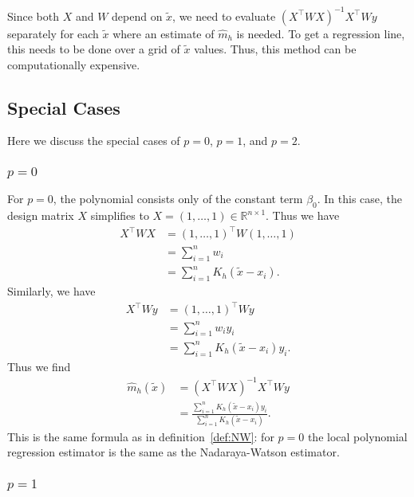 \documentclass[
  a4paper,
]{article}
\theoremstyle{definition}
\theoremstyle{definition}
\theoremstyle{definition}
\theoremstyle{definition}
\theoremstyle{remark}
\begin{document}
Since both \(X\) and \(W\) depend on \(\tilde x\), we need to evaluate
\((X^\top W X)^{-1} X^\top W y\) separately for each \(\tilde x\) where
an estimate of \(\hat m_h\) is needed. To get a regression line, this needs
to be done over a grid of \(\tilde x\) values. Thus, this method can
be computationally expensive.

\subsection{Special Cases}\label{special-cases}

Here we discuss the special cases of \(p=0\), \(p=1\), and \(p=2\).

\subsubsection*{\texorpdfstring{\(p = 0\)}{p = 0}}\label{p-0}

For \(p=0\), the polynomial consists only of the constant term \(\beta_0\).
In this case, the design matrix \(X\) simplifies to \(X = (1, \ldots, 1) \in
\mathbb{R}^{n\times 1}\). Thus we have
\begin{align*}
  X^\top W X
  &= (1, \ldots, 1)^\top W (1, \ldots, 1) \\
  &= \sum_{i=1}^n w_i \\
  &= \sum_{i=1}^n K_h(\tilde x - x_i).
\end{align*}
Similarly, we have
\begin{align*}
  X^\top W y
  &= (1, \ldots, 1)^\top W y \\
  &= \sum_{i=1}^n w_i y_i \\
  &= \sum_{i=1}^n K_h(\tilde x - x_i) y_i.
\end{align*}
Thus we find
\begin{align*}
  \hat m_h(\tilde x)
  &= (X^\top W X)^{-1} X^\top W y \\
  &= \frac{\sum_{i=1}^n K_h(\tilde x - x_i) y_i}{\sum_{i=1}^n K_h(\tilde x - x_i)}.
\end{align*}
This is the same formula as in definition~\ref{def:NW}: for \(p=0\)
the local polynomial regression estimator is the same as the Nadaraya-Watson
estimator.

\subsubsection*{\texorpdfstring{\(p = 1\)}{p = 1}}\label{p-1}
\end{document}
